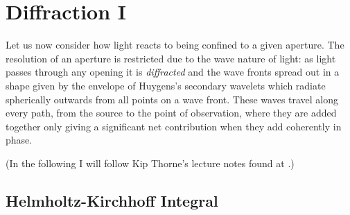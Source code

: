 %
\chapter{Diffraction I}

Let us now consider how light reacts to being confined to a given aperture. The resolution 
of an aperture is restricted due to the wave nature of light: as light passes through any 
opening it is {\it diffracted} and the wave fronts spread out in a shape given by the 
envelope of Huygens's secondary wavelets which radiate spherically outwards from all points on 
a wave front. These waves travel along every path, from the source to the point of observation,
where they are added together only giving a significant net contribution when they add 
coherently in phase. 

\noindent (In the following I will follow Kip Thorne's lecture notes found at 
.)

\section{Helmholtz-Kirchhoff Integral}

